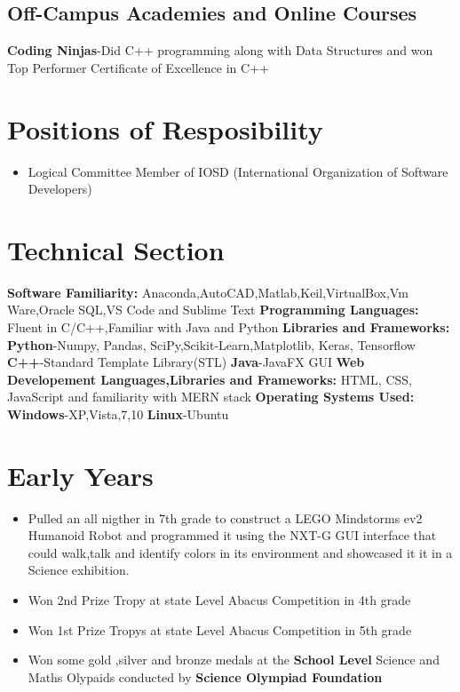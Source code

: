 \documentclass[a4paper,12pt]{article}
\begin{document}
    \subsection*{Off-Campus Academies and Online Courses}
    \textbf{Coding Ninjas}-Did C++ programming along with Data Structures
    and won Top Performer Certificate of Excellence in C++

\section*{Positions of Resposibility}
    \begin{itemize}
        \item Logical Committee Member of IOSD
        (International Organization of Software Developers)
    \end{itemize}


\section*{Technical Section}
\textbf{Software Familiarity: }
\newline
Anaconda,AutoCAD,Matlab,Keil,VirtualBox,Vm Ware,Oracle SQL,VS Code and Sublime Text 
\newline
\textbf{Programming Languages: }
Fluent in C/C++,Familiar with Java and Python
\newline
\textbf{Libraries and Frameworks: }
\newline
\textbf{Python}-Numpy, Pandas, SciPy,Scikit-Learn,Matplotlib, Keras, Tensorflow    
\newline
\textbf{C++}-Standard Template Library(STL)    
\newline
\textbf{Java}-JavaFX GUI    
\newline
\textbf{Web Developement Languages,Libraries and Frameworks: }
\newline
HTML, CSS, JavaScript and familiarity with MERN stack 
\newline
\textbf{Operating Systems Used: }
\newline
\textbf{Windows}-XP,Vista,7,10
\newline 
\textbf{Linux}-Ubuntu


\section*{Early Years}
\begin{itemize}
    \item Pulled an all nigther in 7th grade to construct a LEGO Mindstorms ev2 
    Humanoid Robot and programmed it using the NXT-G GUI interface that could walk,talk 
    and identify colors in its environment and showcased it it in a Science exhibition.
    \item Won 2nd Prize Tropy at state Level Abacus Competition in 4th grade     
    \item Won 1st Prize Tropys at state Level Abacus Competition in 5th grade
    \item Won some gold ,silver and bronze medals at the \textbf{School Level}  Science 
    and Maths Olypaids conducted by \textbf{Science Olympiad Foundation}            
    
\end{itemize}
\end{document}
